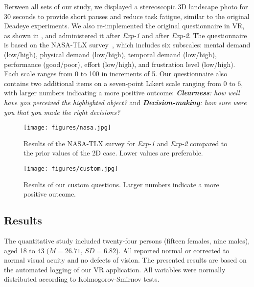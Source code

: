 \documentclass[journal]{vgtc}                %
\begin{document}
Between all sets of our study, we displayed a stereoscopic 3D landscape photo for 30 seconds to provide short pauses and reduce task fatigue, similar to the original Deadeye experiments. We also re-implemented the original questionnaire in VR, as shown in , and administered it after \textit{Exp-1} and after \textit{Exp-2}. The questionnaire is based on the NASA-TLX survey~\cite{hart1988development}, which includes six subscales: mental demand (low/high), physical demand (low/high), temporal demand (low/high), performance (good/poor), effort (low/high), and frustration level (low/high). Each scale ranges from 0 to 100 in increments of 5. Our questionnaire also contains two additional items on a seven-point Likert scale ranging from 0 to 6, with larger numbers indicating a more positive outcome: \textit{\textbf{Clearness}: how well have you perceived the highlighted object?} and \textit{\textbf{Decision-making}: how sure were you that you made the right decisions?}


\begin{figure*}[!t]
\centering
\texttt{[image: figures/nasa.jpg]}
\caption{ Results of the NASA-TLX survey for \textit{Exp-1} and \textit{Exp-2} compared to the prior values of the 2D case. Lower values are preferable.}
\label{fig:nasa}
\end{figure*}



\begin{figure}[!b]
\centering
\texttt{[image: figures/custom.jpg]}
\caption{Results of our custom questions. Larger numbers indicate a more
positive outcome.}
\label{fig:custom}
\end{figure}




\subsection{Results}

The quantitative study included twenty-four persons (fifteen females, nine males), aged 18 to 43 ($M = 26.71,\,SD = 6.82$). All reported normal or corrected to normal visual acuity and no defects of vision. The presented results are based on the automated logging of our VR application. All variables were normally distributed according to Kolmogorov-Smirnov tests.
\end{document}
